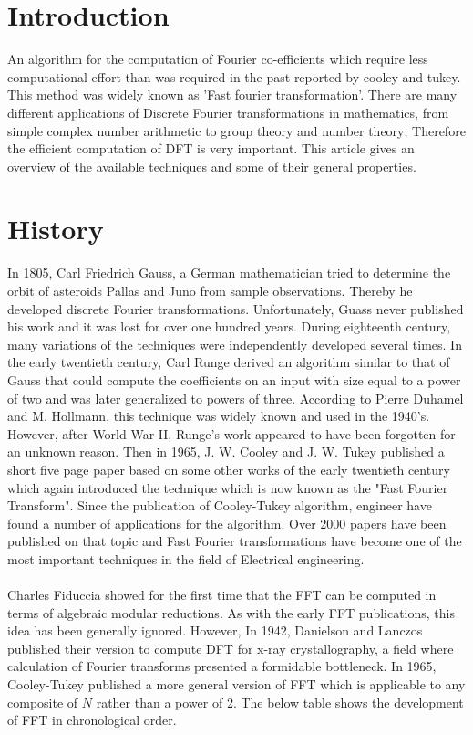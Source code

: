 \documentclass[preprint,12pt]{elsarticle}
\begin{document}

\section{Introduction}
An algorithm for the computation of Fourier co-efficients which require less computational effort than was required in the past reported by cooley and tukey. This method was widely known as 'Fast fourier transformation'.  There are many different applications of Discrete Fourier transformations in mathematics, from simple complex number arithmetic to group theory and number theory; Therefore the efficient computation of DFT is very important. This article gives an overview of the available techniques and some of their general properties.


\section{History}
In 1805, Carl Friedrich Gauss, a German mathematician tried to determine the orbit of asteroids Pallas and Juno from sample observations. Thereby he developed discrete Fourier transformations. Unfortunately, Guass never published his work and it was lost for over one hundred years. During eighteenth century, many variations of the techniques were independently developed several times. In the early twentieth century, Carl Runge derived an algorithm similar to that of Gauss that could compute the coefficients on an input with size equal to a power of two and was later generalized to powers of three. According to Pierre Duhamel and M. Hollmann, this technique was widely known and used in the 1940's. However, after World War II, Runge's work appeared to have been forgotten for an unknown reason. Then in 1965, J. W. Cooley and J. W. Tukey published a short five page paper based on some other works of the early twentieth century which again introduced the technique which is now known as the "Fast Fourier Transform". Since the publication of Cooley-Tukey algorithm, engineer have found a number of applications for the algorithm. Over 2000 papers have been published on that topic and Fast Fourier transformations have become one of the most important techniques in the field of Electrical engineering.\\\\
Charles Fiduccia showed for the first time that the FFT can be computed in terms of algebraic modular reductions. As with the early FFT publications, this idea has been generally ignored. However, In 1942, Danielson and Lanczos published their version to compute DFT for x-ray crystallography, a field where calculation of Fourier transforms presented a formidable bottleneck. In 1965, Cooley-Tukey published a more general version of FFT which is applicable to any composite of $N$ rather than a power of 2. The below table shows the development of FFT in chronological order\cite{stefan}.
\end{document}
